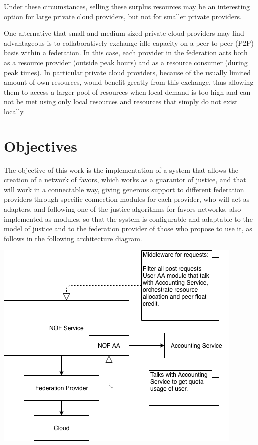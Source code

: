 \documentclass{article}
\begin{document}
Under these circumstances, selling these surplus resources may be an interesting option for large private cloud providers, but not for smaller private providers.

One alternative that small and medium-sized private cloud providers may find advantageous is to collaboratively exchange idle capacity on a peer-to-peer (P2P) basis within a federation. In this case, each provider in the federation acts both as a resource provider (outside peak hours) and as a resource consumer (during peak times). In particular private cloud providers, because of the usually limited amount of own resources, would benefit greatly from this exchange, thus allowing them to access a larger pool of resources when local demand is too high and can not be met using only local resources and resources that simply do not exist locally.

\section{Objectives}
The objective of this work is the implementation of a system that allows the creation of a network of favors, which works as a guarantor of justice, and that will work in a connectable way, giving generous support to different federation providers through specific connection modules for each provider, who will act as adapters, and following one of the justice algorithms for favors networks, also implemented as modules, so that the system is configurable and adaptable to the model of justice and to the federation provider of those who propose to use it, as follows in the following architecture diagram.

\begin{center}
\includegraphics[scale=0.4]{./image/NOF-architecture-generic.png}
\end{center}
\end{document}
